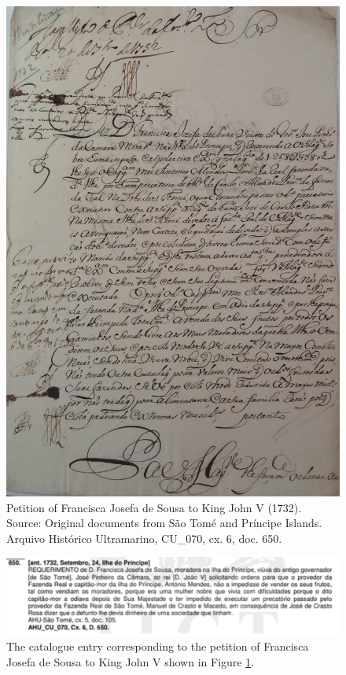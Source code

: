 \documentclass{article}
\begin{document}
\begin{figure}
\centering
\includegraphics[scale=0.27]{original.pdf}
\caption{Petition of Francisca Josefa de Sousa to King John V (1732). Source: Original documents from São Tomé and Príncipe Islands. Arquivo Histórico Ultramarino, CU\_070, cx. 6, doc. 650.}
\label{fig:original}
\end{figure}

\begin{figure}
	\centering
	\includegraphics[scale=0.75]{catalog.pdf}
	\caption{The catalogue entry corresponding to the petition of Francisca Josefa de Sousa to King John V shown in Figure \ref{fig:original}.}
	\label{fig:catalog}
\end{figure}
\end{document}
